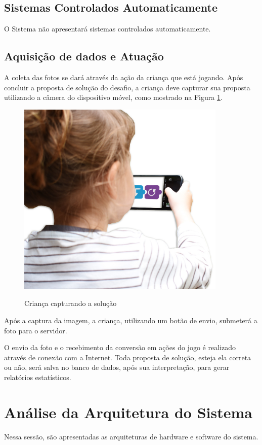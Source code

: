     \subsection{Sistemas Controlados Automaticamente}
    O Sistema não apresentará sistemas controlados automaticamente.
    
    \subsection{Aquisição de dados e Atuação}
    A coleta das fotos se dará através da ação da criança que está jogando. Após concluir a proposta de solução do desafio, a criança deve capturar sua proposta utilizando a câmera do dispositivo móvel, como mostrado na Figura \ref{figura:crianca_blocos}.
    
    \begin{figure}[H]
        \caption{Criança capturando a solução}
        \centering
        \includegraphics[width=10cm]{Imagens/Cap3/CriançaBlocos.jpg}
        \label{figura:crianca_blocos}
    \end{figure}
    
    Após a captura da imagem, a criança, utilizando um botão de envio, submeterá a foto para o servidor.
    
    O envio da foto e o recebimento da conversão em ações do jogo é realizado através de conexão com a Internet.
    Toda proposta de solução, esteja ela correta ou não, será salva no banco de dados, após sua interpretação, para gerar relatórios estatísticos.


\section{Análise da Arquitetura do Sistema}
    Nessa sessão, são apresentadas as arquiteturas de hardware e software do sistema.

